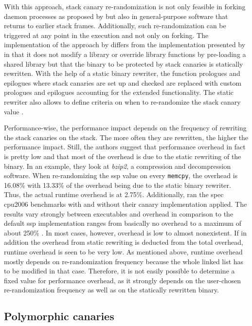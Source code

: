 With this approach, stack canary re-randomization is not only feasible in forking daemon processes as proposed by \citeauthor{MarcoGisbert2013} \cite{MarcoGisbert2013} but also in general-purpose software that returns to earlier stack frames.
Additionally, such re-randomization can be triggered at any point in the execution and not only on forking.
The implementation of the approach by \citeauthor{Hawkins2016} differs from the implementation presented by \citeauthor{MarcoGisbert2013} in that it does not modify a library or override library functions by pre-loading a shared library but that the binary to be protected by stack canaries is statically rewritten.
With the help of a static binary rewriter, the function prologues and epilogues where stack canaries are set up and checked are replaced with custom prologues and epilogues accounting for the extended functionality.
The static rewriter also allows to define criteria on when to re-randomize the stack canary value \cite{Hawkins2016}.

Performance-wise, the performance impact depends on the frequency of rewriting the stack canaries on the stack.
The more often they are rewritten, the higher the performance impact.
Still, the authors suggest that performance overhead in fact is pretty low and that most of the overhead is due to the static rewriting of the binary.
In an example, they look at \emph{bzip2}, a compression and decompression software.
When re-randomizing the \gls{ssp} value on every \texttt{memcpy}, the overhead is 16.08\% with 13.33\% of the overhead being due to the static binary rewriter.
Thus, the actual runtime overhead is at 2.75\%.
Additionally, \citeauthor{Hawkins2016} ran the \gls{spec} \acs{cpu}2006 benchmarks with and without their canary implementation applied.
The results vary strongly between executables and overhead in comparison to the default \gls{ssp} implementation ranges from basically no overhead to a maximum of about 250\% \cite{Hawkins2016}.
In most cases, however, overhead is low to almost nonexistent.
If in addition the overhead from static rewriting is deducted from the total overhead, runtime overhead is seen to be very low.
As mentioned above, runtime overhead mostly depends on re-randomization frequency because the whole linked list has to be modified in that case.
Therefore, it is not easily possible to determine a fixed value for performance overhead, as it strongly depends on the user-chosen re-randomization frequency as well as on the statically rewritten binary.

\subsection{Polymorphic canaries}
\label{subsec:polymorphic-canaries}

